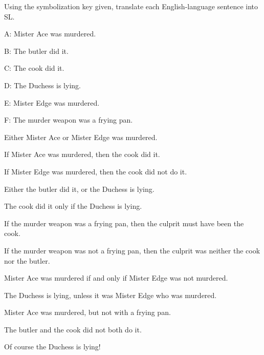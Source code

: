 \noindent\problempart Using the symbolization key given, translate each English-language sentence into SL.
\begin{ekey}
\item[A:] Mister Ace was murdered.
\item[B:] The butler did it.
\item[C:] The cook did it.
\item[D:] The Duchess is lying.
\item[E:] Mister Edge was murdered.
\item[F:] The murder weapon was a frying pan.
\end{ekey}
\begin{exercises}
\item Either Mister Ace or Mister Edge was murdered. %
\item If Mister Ace was murdered, then the cook did it. %
\item If Mister Edge was murdered, then the cook did not do it. %
\item Either the butler did it, or the Duchess is lying. %
\item The cook did it only if the Duchess is lying. %
\item If the murder weapon was a frying pan, then the culprit must have been the cook. %
\item If the murder weapon was not a frying pan, then the culprit was neither the cook nor the butler. %
\item Mister Ace was murdered if and only if Mister Edge was not murdered. %
\item The Duchess is lying, unless it was Mister Edge who was murdered. %
\item Mister Ace was murdered, but not with a frying pan. %
\item The butler and the cook did not both do it. %
\item Of course the Duchess is lying! %
\end{exercises}

